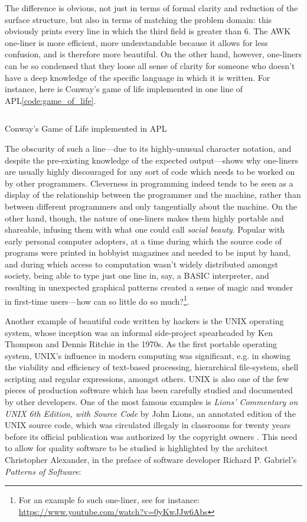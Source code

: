 The difference is obvious, not just in terms of formal clarity and reduction of the surface structure, but also in terms of matching the problem domain: this obviously prints every line in which the third field is greater than 6. The AWK one-liner is more efficient, more understandable because it allows for less confusion, and is therefore more beautiful. On the other hand, however, one-liners can be so condensed that they loose all sense of clarity for someone who doesn't have a deep knowledge of the specific language in which it is written. For instance, here is Conway's game of life implemented in one line of APL\ref{code:game_of_life}.

\begin{listing}
  \inputminted{text}{./corpus/game_of_life.apl}
  \caption{Conway's Game of Life implemented in APL}
  \label{code:game_of_life}
\end{listing}

The obscurity of such a line—due to its highly-unusual character notation, and despite the pre-existing knowledge of the expected output—shows why one-liners are usually highly discouraged for any sort of code which needs to be worked on by other programmers. Cleverness in programming indeed tends to be seen as a display of the relationship between the programmer and the machine, rather than between different programmers and only tangentially about the machine. On the other hand, though, the nature of one-liners makes them highly portable and shareable, infusing them with what one could call \emph{social beauty}. Popular with early personal computer adopters, at a time during which the source code of programs were printed in hobbyist magazines and needed to be input by hand, and during which access to computation wasn't widely distributed amongst society, being able to type just one line in, say, a BASIC interpreter, and resulting in unexpected graphical patterns created a sense of magic and wonder in first-time users—how can so little do so much?\footnote{For an example fo such one-liner, see for instance: \url{https://www.youtube.com/watch?v=0yKwJJw6Abs}}.

Another example of beautiful code written by hackers is the UNIX operating system, whose inception was an informal side-project spearheaded by Ken Thompson and Dennis Ritchie in the 1970s. As the first portable operating system, UNIX's influence in modern computing was significant, e.g. in showing the viability and efficiency of text-based processing, hierarchical file-system, shell scripting and regular expressions, amongst others. UNIX is also one of the few pieces of production software which has been carefully studied and documented by other developers. One of the most famous examples is \emph{Lions' Commentary on UNIX 6th Edition, with Source Code} by John Lions, an annotated edition of the UNIX source code, which was circulated illegaly in classrooms for twenty years before its official publication was authorized by the copyright owners \citep{lions_lions_1996}. This need to allow for quality software to be studied is highlighted by the architect Christopher Alexander, in the preface of software developer Richard P. Gabriel's \emph{Patterns of Software}:

